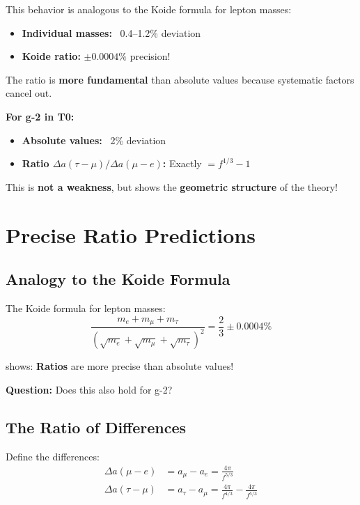 	This behavior is analogous to the Koide formula for lepton masses:
	
	\begin{itemize}
		\item \textbf{Individual masses:} ~0.4--1.2\% deviation
		\item \textbf{Koide ratio:} $\pm 0.0004\%$ precision!
	\end{itemize}
	
	The ratio is \textbf{more fundamental} than absolute values because systematic factors cancel out.
	
	\textbf{For g-2 in T0:}
	\begin{itemize}
		\item \textbf{Absolute values:} ~2\% deviation
		\item \textbf{Ratio $\Delta a(\tau-\mu)/\Delta a(\mu-e)$:} Exactly $= f^{1/3} - 1$
	\end{itemize}
	
	This is \textbf{not a weakness}, but shows the \textbf{geometric structure} of the theory!
	
	\section{Precise Ratio Predictions}
	
	\subsection{Analogy to the Koide Formula}
	
	The Koide formula for lepton masses:
	\begin{equation}
		\frac{m_e + m_\mu + m_\tau}{(\sqrt{m_e} + \sqrt{m_\mu} + \sqrt{m_\tau})^2} = \frac{2}{3} \pm 0.0004\%
	\end{equation}
	
	shows: \textbf{Ratios} are more precise than absolute values!
	
	\textbf{Question:} Does this also hold for g-2?
	
	\subsection{The Ratio of Differences}
	
	Define the differences:
	\begin{align}
		\Delta a(\mu - e) &= a_\mu - a_e = \frac{4\pi}{f^{5/3}} \\
		\Delta a(\tau - \mu) &= a_\tau - a_\mu = \frac{4\pi}{f^{4/3}} - \frac{4\pi}{f^{5/3}}
	\end{align}
	
